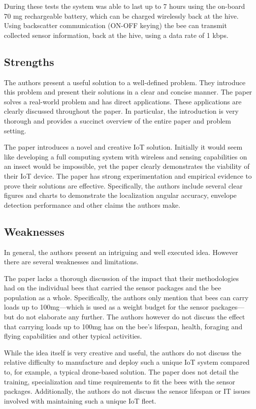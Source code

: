 \documentclass[letterpaper,twocolumn,10pt]{article}
\begin{document}
During these tests the system was able to last up to 7 hours using the on-board 70 mg rechargeable battery, which can be charged wirelessly back at the hive. Using backscatter communication (ON-OFF keying) the bee can transmit collected sensor information, back at the hive, using a data rate of 1 kbps. 

\subsection*{Strengths}

The authors present a useful solution to a well-defined problem. They introduce this problem and present their solutions in a clear and concise manner. The paper solves a real-world problem and has direct applications. These applications are clearly discussed throughout the paper. In particular, the introduction is very thorough and provides a succinct overview of the entire paper and problem setting.

The paper introduces a novel and creative IoT solution. Initially it would seem like developing a full computing system with wireless and sensing capabilities on an insect would be impossible, yet the paper clearly demonstrates the viability of their IoT device. The paper has strong experimentation and empirical evidence to prove their solutions are effective. Specifically, the authors include several clear figures and charts to demonstrate the localization angular accuracy, envelope detection performance and other claims the authors make.

\subsection*{Weaknesses}

In general, the authors present an intriguing and well executed idea. However there are several weaknesses and limitations.

The paper lacks a thorough discussion of the impact that their methodologies had on the individual bees that carried the sensor packages and the bee population as a whole. Specifically, the authors only mention that bees can carry loads up to 100mg---which is used as a weight budget for the sensor packages---but do not elaborate any further. The authors however do not discuss the effect that carrying loads up to 100mg has on the bee's lifespan, health, foraging and flying capabilities and other typical activities.

While the idea itself is very creative and useful, the authors do not discuss the relative difficulty to manufacture and deploy such a unique IoT system compared to, for example, a typical drone-based solution. The paper does not detail the training, specialization and time requirements to fit the bees with the sensor packages. Additionally, the authors do not discuss the sensor lifespan or IT issues involved with maintaining such a unique IoT fleet.
\end{document}
